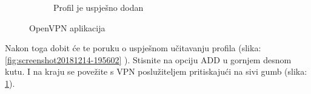 \begin{figure}[h]
\begin{subfigure}{0.49\textwidth}
		\caption{Profil je uspješno dodan}
		\label{fig:screenshot20181214-195614}
	\end{subfigure}
	\caption{OpenVPN aplikacija}
	\label{fig:combined}
\end{figure}
Nakon toga dobit će te poruku o uspješnom učitavanju profila (slika: \ref{fig:screenshot20181214-195602} ). Stisnite na opciju ADD u gornjem desnom kutu. I na kraju se povežite s VPN poslužiteljem pritiskajući na sivi gumb (slika: \ref{fig:screenshot20181214-195614}). 


